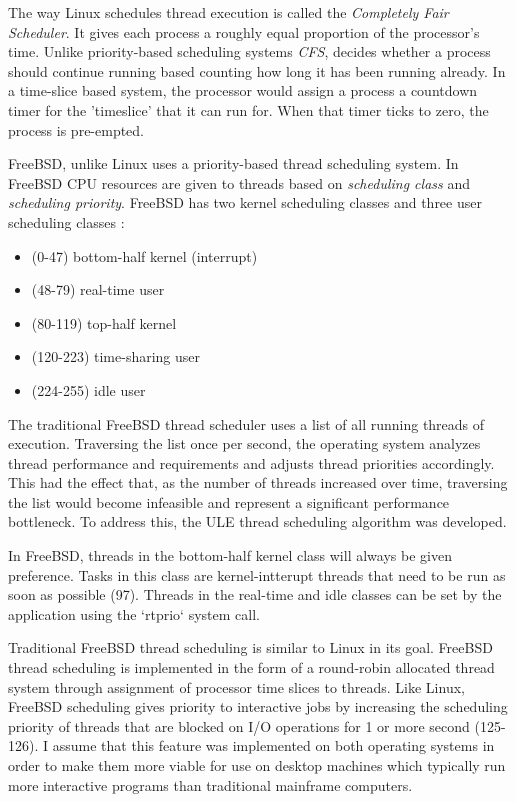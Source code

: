 \documentclass[onecolumn,10pt]{IEEETran}
\begin{document}
	The way Linux schedules thread execution is called the \textit{Completely Fair Scheduler}.  It gives each process a roughly equal proportion of the processor's time.  Unlike priority-based scheduling systems \textit{CFS}, decides whether a process should continue running based counting how long it has been running already.  In a time-slice based system, the processor would assign a process a countdown timer for the 'timeslice' that it can run for.  When that timer ticks to zero, the process is pre-empted.

	FreeBSD, unlike Linux uses a priority-based thread scheduling system.  In FreeBSD CPU resources are given to threads based on \textit{scheduling class} and \textit{scheduling priority}.  FreeBSD has two kernel scheduling classes and three user scheduling classes \cite{freebsd} :
		\begin{itemize}
			\item (0-47) bottom-half kernel (interrupt)
			\item (48-79) real-time user
			\item (80-119) top-half kernel
			\item (120-223) time-sharing user
			\item (224-255) idle user
		\end{itemize}

	The traditional FreeBSD thread scheduler uses a list of all running threads of execution.  Traversing the list once per second, the operating system analyzes thread performance and requirements and adjusts thread priorities accordingly.  This had the effect that, as the number of threads increased over time, traversing the list would become infeasible and represent a significant performance bottleneck.  To address this, the ULE thread scheduling algorithm was developed.

	In FreeBSD, threads in the bottom-half kernel class will always be given preference.  Tasks in this class are kernel-intterupt threads that need to be run as soon as possible (97).  Threads in the real-time and idle classes can be set by the application using the `rtprio` system call.

	Traditional FreeBSD thread scheduling is similar to Linux in its goal.  FreeBSD thread scheduling is implemented in the form of a round-robin allocated thread system through assignment of processor time slices to threads.  Like Linux, FreeBSD scheduling gives priority to interactive jobs by increasing the scheduling priority of threads that are blocked on I/O operations for 1 or more second (125-126).  
	I assume that this feature was implemented on both operating systems in order to make them more viable for use on desktop machines which typically run more interactive programs than traditional mainframe computers.
\end{document}
